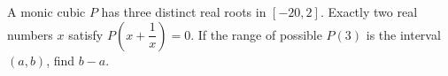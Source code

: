A monic cubic $P$ has three distinct real roots in $[-20,2]$. Exactly two real numbers $x$ satisfy $P(x+\dfrac{1}{x})=0$. If the range of possible $P(3)$ is the interval $(a,b)$, find $b-a$.
